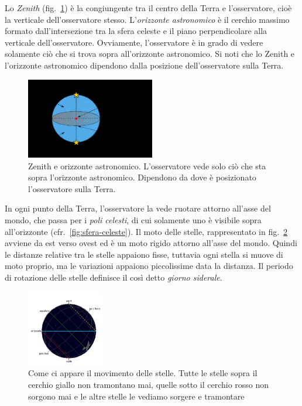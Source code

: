 Lo \emph{Zenith} (fig.~\ref{fig:zenith}) è la congiungente tra il centro della Terra e l'osservatore, cioè la verticale dell'osservatore stesso. L'\emph{orizzonte astronomico} è il cerchio massimo formato dall'intersezione tra la sfera celeste e il piano perpendicolare alla verticale dell'osservatore. Ovviamente, l'osservatore è in grado di vedere solamente ciò che si trova sopra all'orizzonte astronomico. Si noti che lo Zenith e l'orizzonte astronomico dipendono dalla posizione dell'osservatore sulla Terra.

\begin{figure}
\centering
\includegraphics[width=0.5\textwidth]{immagini/zenit.jpg}
\caption{Zenith e orizzonte astronomico. L'osservatore vede solo ciò che sta sopra l'orizzonte astronomico. Dipendono da dove è posizionato l'osservatore sulla Terra.}
\label{fig:zenith}
\end{figure}

In ogni punto della Terra, l'osservatore la vede ruotare attorno all'asse del mondo, che passa per i \emph{poli celesti}, di cui solamente uno è visibile sopra all'orizzonte (cfr.~\ref{fig:sfera-celeste}). Il moto delle stelle, rappresentato in fig.~\ref{fig:movimento-stelle} avviene da est verso ovest ed è un moto rigido attorno all'asse del mondo. Quindi le distanze relative tra le stelle appaiono fisse, tuttavia ogni stella si muove di moto proprio, ma le variazioni appaiono piccolissime data la distanza. Il periodo di rotazione delle stelle definisce il così detto \emph{giorno siderale}.

\begin{figure}
\centering
\includegraphics[width=0.3\textwidth]{immagini/movimento-stelle.jpg}
\caption{Come ci appare il movimento delle stelle. Tutte le stelle sopra il cerchio giallo non tramontano mai, quelle sotto il cerchio rosso non sorgono mai e le altre stelle le vediamo sorgere e tramontare}
\label{fig:movimento-stelle}
\end{figure}

